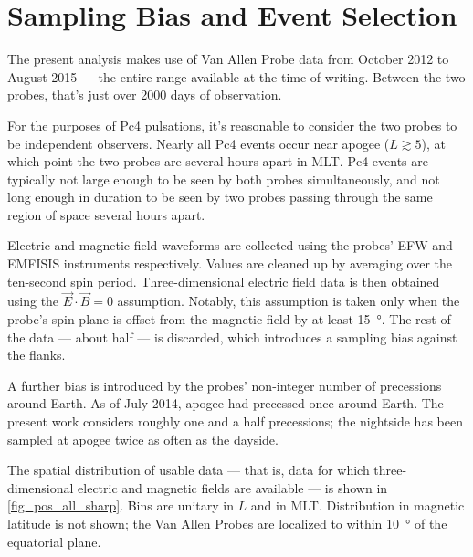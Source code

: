 \section{Sampling Bias and Event Selection}
  \label{sec_selection}

The present analysis makes use of Van Allen Probe data from October 2012 to August 2015 --- the entire range available at the time of writing. Between the two probes, that's just over 2000 days of observation. 

For the purposes of Pc4 pulsations, it's reasonable to consider the two probes to be independent observers. Nearly all Pc4 events occur near apogee ($L\gtrsim5$), at which point the two probes are several hours apart in MLT. Pc4 events are typically not large enough to be seen by both probes simultaneously, and not long enough in duration to be seen by two probes passing through the same region of space several hours apart. 


Electric and magnetic field waveforms are collected using the probes' EFW and EMFISIS instruments respectively. Values are cleaned up by averaging over the ten-second spin period. Three-dimensional electric field data is then obtained using the $\vec{E} \cdot \vec{B} = 0$ assumption. Notably, this assumption is taken only when the probe's spin plane is offset from the magnetic field by at least \SI{15}{\degree}. The rest of the data --- about half --- is discarded, which introduces a sampling bias against the flanks. 

A further bias is introduced by the probes' non-integer number of precessions around Earth. As of July 2014, apogee had precessed once around Earth\cite{dai_2015}. The present work considers roughly one and a half precessions; the nightside has been sampled at apogee twice as often as the dayside. 

The spatial distribution of usable data --- that is, data for which three-dimensional electric and magnetic fields are available --- is shown in \cref{fig_pos_all_sharp}. Bins are unitary in $L$ and in MLT. Distribution in magnetic latitude is not shown; the Van Allen Probes are localized to within \about\SI{10}{\degree} of the equatorial plane. 

